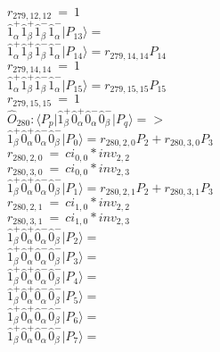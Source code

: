 \documentclass[14pt]{article}
\begin{document}
    ${r}_{279,12,12}\ =\ 1 $ \\ 
    $ \hat{1}_{\alpha}^{+}\hat{1}_{\beta}^{+}\hat{1}_{\beta}^{-}\hat{1}_{\alpha}^{-} \vert{P_{13}}\rangle =  $ \\ 
    $ \hat{1}_{\alpha}^{+}\hat{1}_{\beta}^{+}\hat{1}_{\beta}^{-}\hat{1}_{\alpha}^{-} \vert{P_{14}}\rangle = {r}_{279,14,14}P_{14} $ \\ 
    ${r}_{279,14,14}\ =\ 1 $ \\ 
    $ \hat{1}_{\alpha}^{+}\hat{1}_{\beta}^{+}\hat{1}_{\beta}^{-}\hat{1}_{\alpha}^{-} \vert{P_{15}}\rangle = {r}_{279,15,15}P_{15} $ \\ 
    ${r}_{279,15,15}\ =\ 1 $ \\ 
    
    $\hat{O}_{280}:  \langle{P_p}\vert \hat{1}_{\beta}^{+}\hat{0}_{\alpha}^{+}\hat{0}_{\alpha}^{-}\hat{0}_{\beta}^{-} \vert{P_q}\rangle => $ \\ 
    $ \hat{1}_{\beta}^{+}\hat{0}_{\alpha}^{+}\hat{0}_{\alpha}^{-}\hat{0}_{\beta}^{-} \vert{P_{0}}\rangle = {r}_{280,2,0}P_{2}+{r}_{280,3,0}P_{3} $ \\ 
    ${r}_{280,2,0}\ =\ {ci}_{0,0}*{inv}_{2,2} $ \\ 
    ${r}_{280,3,0}\ =\ {ci}_{0,0}*{inv}_{2,3} $ \\ 
    $ \hat{1}_{\beta}^{+}\hat{0}_{\alpha}^{+}\hat{0}_{\alpha}^{-}\hat{0}_{\beta}^{-} \vert{P_{1}}\rangle = {r}_{280,2,1}P_{2}+{r}_{280,3,1}P_{3} $ \\ 
    ${r}_{280,2,1}\ =\ {ci}_{1,0}*{inv}_{2,2} $ \\ 
    ${r}_{280,3,1}\ =\ {ci}_{1,0}*{inv}_{2,3} $ \\ 
    $ \hat{1}_{\beta}^{+}\hat{0}_{\alpha}^{+}\hat{0}_{\alpha}^{-}\hat{0}_{\beta}^{-} \vert{P_{2}}\rangle =  $ \\ 
    $ \hat{1}_{\beta}^{+}\hat{0}_{\alpha}^{+}\hat{0}_{\alpha}^{-}\hat{0}_{\beta}^{-} \vert{P_{3}}\rangle =  $ \\ 
    $ \hat{1}_{\beta}^{+}\hat{0}_{\alpha}^{+}\hat{0}_{\alpha}^{-}\hat{0}_{\beta}^{-} \vert{P_{4}}\rangle =  $ \\ 
    $ \hat{1}_{\beta}^{+}\hat{0}_{\alpha}^{+}\hat{0}_{\alpha}^{-}\hat{0}_{\beta}^{-} \vert{P_{5}}\rangle =  $ \\ 
    $ \hat{1}_{\beta}^{+}\hat{0}_{\alpha}^{+}\hat{0}_{\alpha}^{-}\hat{0}_{\beta}^{-} \vert{P_{6}}\rangle =  $ \\ 
    $ \hat{1}_{\beta}^{+}\hat{0}_{\alpha}^{+}\hat{0}_{\alpha}^{-}\hat{0}_{\beta}^{-} \vert{P_{7}}\rangle =  $ \\ 
\end{document}
